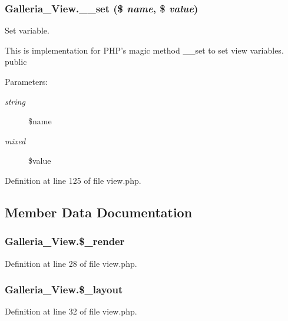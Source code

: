 \subsubsection{\setlength{\rightskip}{0pt plus 5cm}Galleria\_\-View.\_\-\_\-set (\$ {\em name}, \$ {\em value})}\label{classGalleria__View_7fc14f482e9555f0033b3856bbd92d8b}


Set variable.

This is implementation for PHP's magic method \_\-\_\-set to set view variables.  public \begin{Desc}
\item[Parameters:]
\begin{description}
\item[{\em string}]\$name \item[{\em mixed}]\$value \end{description}
\end{Desc}


Definition at line 125 of file view.php.

\subsection{Member Data Documentation}
\subsubsection{\setlength{\rightskip}{0pt plus 5cm}Galleria\_\-View.\$\_\-render\hspace{0.3cm}{\tt  [protected]}}\label{classGalleria__View_94b63e0a517f82168b6c5d06568476ab}




Definition at line 28 of file view.php.
\subsubsection{\setlength{\rightskip}{0pt plus 5cm}Galleria\_\-View.\$\_\-layout\hspace{0.3cm}{\tt  [protected]}}\label{classGalleria__View_9c93e8bb5c9baa6a51b6f60198a6391c}




Definition at line 32 of file view.php.
